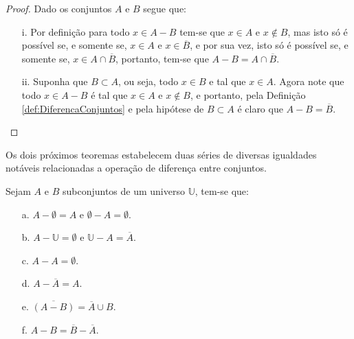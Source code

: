 \begin{proof}
	Dado os conjuntos $A$ e $B$ segue que:
	\begin{itemize}
		\item[i.] Por definição para todo $x \in A - B$ tem-se que $x \in A$ e $x \notin B$, mas isto só é possível se, e somente se, $x \in A$ e $x \in \overline{B}$, e por sua vez, isto só é possível se, e somente se, $x \in A \cap \overline{B}$, portanto, tem-se que $A - B = A \cap \overline{B}$.
		\item[ii.] Suponha que $B \subset A$, ou seja, todo $x \in B$ e tal que $x \in A$. Agora note que todo $x \in A - B$ é tal que $x \in A$ e $x \notin B$, e portanto, pela Definição \ref{def:DiferencaConjuntos} e pela hipótese de $B \subset A$ é claro que $A - B = \overline{B}$.
	\end{itemize}
\end{proof}

Os dois próximos teoremas estabelecem duas séries de diversas igualdades notáveis relacionadas a operação de diferença entre conjuntos.

\begin{theorem}\label{teo:ElementarDiferencaConjuntos1}
	Sejam $A$ e $B$ subconjuntos de um universo $\mathbb{U}$, tem-se que:
	\begin{itemize}
		\item[a.] $A - \emptyset = A$ e $\emptyset - A = \emptyset$.
		\item[b.] $A - \mathbb{U} = \emptyset$ e $\mathbb{U} - A = \overline{A}$.
		\item[c.] $A - A = \emptyset$.
		\item[d.] $A - \overline{A} = A$.
		\item[e.] $\overline{(A - B)} = \overline{A} \cup B$.
		\item[f.] $A - B = \overline{B} - \overline{A}$.
	\end{itemize}
\end{theorem}

